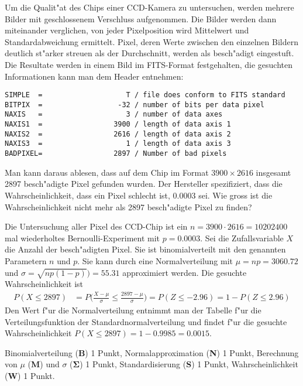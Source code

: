 Um die Qualit"at des Chips einer CCD-Kamera zu untersuchen, werden mehrere
Bilder mit geschlossenem Verschluss aufgenommen.
Die Bilder werden dann miteinander verglichen, von jeder Pixelposition
wird Mittelwert und Standardabweichung ermittelt.
Pixel, deren Werte zwischen den einzelnen Bildern deutlich st"arker streuen
als der Durchschnitt, werden als besch"adigt eingestuft.
Die Resultate werden in einem Bild im FITS-Format festgehalten, die
gesuchten Informationen kann man dem Header entnehmen:
\begin{verbatim}
SIMPLE  =                    T / file does conform to FITS standard
BITPIX  =                  -32 / number of bits per data pixel
NAXIS   =                    3 / number of data axes
NAXIS1  =                 3900 / length of data axis 1
NAXIS2  =                 2616 / length of data axis 2
NAXIS3  =                    1 / length of data axis 3
BADPIXEL=                 2897 / Number of bad pixels  
\end{verbatim}
Man kann daraus ablesen, dass auf dem Chip im Format
$3900\times 2616$ insgesamt 2897 besch"adigte Pixel gefunden wurden.
Der Hersteller spezifiziert, dass die Wahrscheinlichkeit, dass ein Pixel
schlecht ist, $0.0003$ sei.
Wie gross ist die Wahrscheinlichkeit nicht mehr als 2897 besch"adigte Pixel
zu finden?

\begin{loesung}
Die Untersuchung aller Pixel des CCD-Chip ist ein $n=3900\cdot2616=10202400$
mal wiederholtes Bernoulli-Experiment mit $p=0.0003$.
Sei die Zufallsvariable $X$ die Anzahl der besch"adigten Pixel.
Sie ist binomialverteilt mit den genannten Parametern $n$ und $p$.
Sie kann durch eine Normalverteilung mit $\mu = np = 3060.72$
und $\sigma = \sqrt{np(1-p)})=55.31$ approximiert werden.
Die gesuchte Wahrscheinlichkeit ist
\begin{align*}
P(X\le 2897)
&=
P\biggl(
\frac{X-\mu}{\sigma}\le\frac{2897-\mu}{\sigma}
\biggr)
=
P(Z\le -2.96)
=
1-P(Z\le 2.96)
\end{align*}
Den Wert f"ur die Normalverteilung entnimmt man der Tabelle f"ur die
Verteilungsfunktion der Standardnormalverteilung und findet f"ur die
gesuchte Wahrscheinlichkeit
$P(X\le 2897) = 1-0.9985=0.0015$.
\end{loesung}

\begin{bewertung}
Binomialverteilung ({\bf B}) 1 Punkt,
Normalapproximation ({\bf N}) 1 Punkt,
Berechnung von $\mu$ ({\bf M}) und $\sigma$ ($\mathbf{\Sigma}$) 1 Punkt,
Standardisierung ({\bf S}) 1 Punkt,
Wahrscheinlichkeit ({\bf W}) 1 Punkt.
\end{bewertung}



